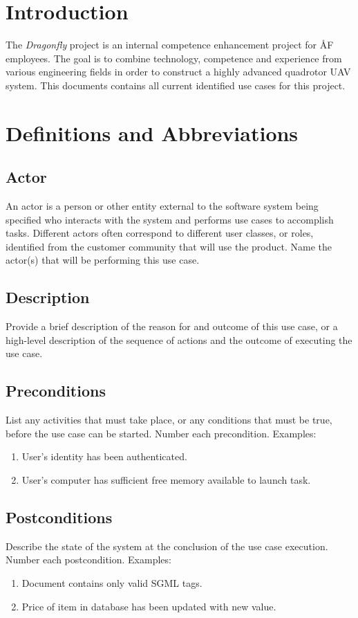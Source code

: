 \documentclass[a4paper]{article}
\begin{document}
\newpage

\section{Introduction}

The \emph{Dragonfly} project is an internal competence enhancement project for ÅF employees. The goal is to combine technology, competence and experience from various engineering fields in order to construct a highly advanced quadrotor UAV system. This documents contains all current identified use cases for this project.

\section{Definitions and Abbreviations}

\subsection{Actor}
An actor is a person or other entity external to the software system being specified who interacts with the system and performs use cases to accomplish tasks. Different actors often correspond to different user classes, or roles, identified from the customer community that will use the product. Name the actor(s) that will be performing this use case.
\subsection{Description}
Provide a brief description of the reason for and outcome of this use case, or a high-level description of the sequence of actions and the outcome of executing the use case.
\subsection{Preconditions}
List any activities that must take place, or any conditions that must be true, before the use case can be started. Number each precondition. Examples:
\begin{enumerate}
	\item User’s identity has been authenticated.
	\item User’s computer has sufficient free memory available to launch task.
\end{enumerate}
\subsection{Postconditions}
Describe the state of the system at the conclusion of the use case execution. Number each postcondition. Examples:
\begin{enumerate}
	\item Document contains only valid SGML tags.
	\item Price of item in database has been updated with new value.
\end{enumerate}
\end{document}
